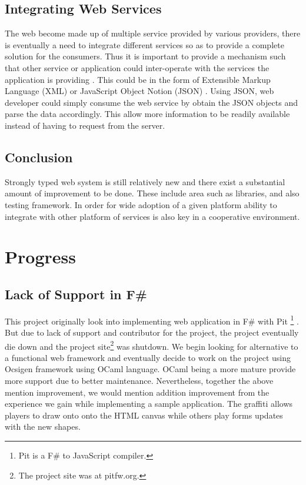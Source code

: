 \documentclass[12pt,fullpage]{article}
\begin{document}
\subsection{Integrating Web Services}
The web become made up of multiple service provided by various providers,
there is eventually a need to integrate different services so as to provide a
complete solution for the consumers. Thus it is important to provide a mechanism
such that other service or application could inter-operate with the services the
application is providing \parencite{bosworth01}. This could be in the form of
Extensible Markup Language (XML) or JavaScript Object Notion (JSON)
\parencite{lin12}. Using JSON, web developer could simply consume the web
service by obtain the JSON objects and parse the data accordingly. This allow
more information to be readily available instead of having to request from
the server.


\subsection{Conclusion}
Strongly typed web system is still relatively new and there exist a substantial
amount of improvement to be done. These include area such as libraries, and also
testing framework. In order for wide adoption of a given platform ability to
integrate with other platform of services is also key in a cooperative
environment.

\section{Progress}
\subsection{Lack of Support in F\#}
This project originally look into implementing web application in F\# with Pit
\footnote{Pit is a F\# to JavaScript compiler.} \parencite{giannini12}. But due
to lack of support and contributor for the project, the project eventually die
down and the project site\footnote{The project site was at pitfw.org.} was
shutdown. We begin looking for alternative to a functional web framework and
eventually decide to work on the project using Ocsigen framework using OCaml
language. OCaml being a more mature provide more support due to better
maintenance. Nevertheless, together the above mention improvement, we would
mention addition improvement from the experience we gain while implementing
a sample application. The graffiti allows players to draw onto onto the HTML
canvas while others play forms updates with the new shapes.
\end{document}
